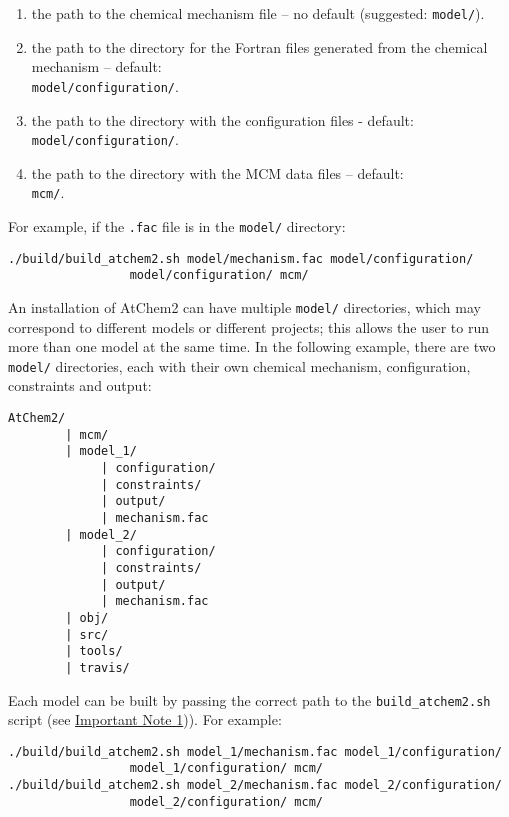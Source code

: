 \begin{enumerate}
\item the path to the chemical mechanism file -- no default
  (suggested: \texttt{model/}).
\item the path to the directory for the Fortran files generated from
  the chemical mechanism -- default:\\ \texttt{model/configuration/}.
\item the path to the directory with the configuration files -
  default:\\ \texttt{model/configuration/}.
\item the path to the directory with the MCM data files -- default:\\
  \texttt{mcm/}.
\end{enumerate}

For example, if the \texttt{.fac} file is in the \texttt{model/}
directory:

\begin{verbatim}
./build/build_atchem2.sh model/mechanism.fac model/configuration/
                 model/configuration/ mcm/
\end{verbatim}

An installation of AtChem2 can have multiple \texttt{model/}
directories, which may correspond to different models or different
projects; this allows the user to run more than one model at the same
time. In the following example, there are two \texttt{model/}
directories, each with their own chemical mechanism, configuration,
constraints and output:

\newpage
\begin{verbatim}
AtChem2/
        | mcm/
        | model_1/
             | configuration/
             | constraints/
             | output/
             | mechanism.fac
        | model_2/
             | configuration/
             | constraints/
             | output/
             | mechanism.fac
        | obj/
        | src/
        | tools/
        | travis/
\end{verbatim}

Each model can be built by passing the correct path to the
\texttt{build\_atchem2.sh} script (see \hyperref[important-note-1]{Important
  Note 1})). For example:

\begin{verbatim}
./build/build_atchem2.sh model_1/mechanism.fac model_1/configuration/
                 model_1/configuration/ mcm/
./build/build_atchem2.sh model_2/mechanism.fac model_2/configuration/
                 model_2/configuration/ mcm/
\end{verbatim}

